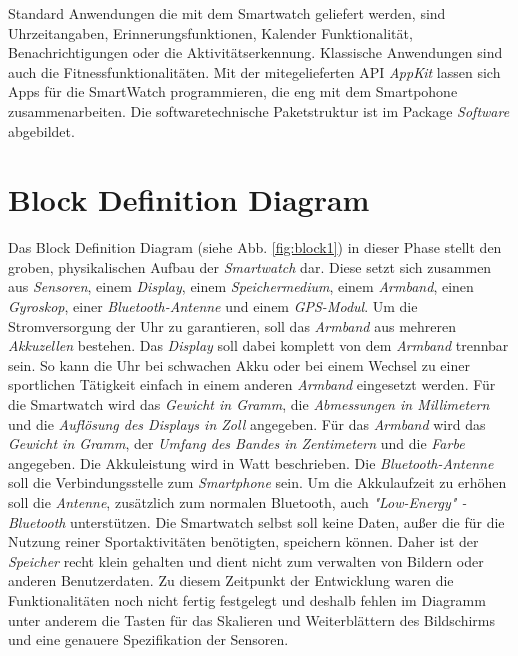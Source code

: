 Standard Anwendungen die mit dem Smartwatch geliefert werden, sind Uhrzeitangaben, Erinnerungsfunktionen, Kalender Funktionalität, Benachrichtigungen oder die Aktivitätserkennung. Klassische Anwendungen sind auch die Fitnessfunktionalitäten.
Mit der mitegelieferten API \textit{AppKit} lassen sich Apps für die SmartWatch programmieren, die eng mit dem Smartpohone zusammenarbeiten.
Die softwaretechnische Paketstruktur ist im Package \textit{Software} abgebildet.

\section{Block Definition Diagram}

Das Block Definition Diagram (siehe Abb. \ref{fig:block1}) in dieser Phase stellt den groben, physikalischen Aufbau der \textit{Smartwatch} dar. Diese setzt sich zusammen aus \textit{Sensoren}, einem \textit{Display}, einem \textit{Speichermedium}, einem \textit{Armband}, einen \textit{Gyroskop}, einer \textit{Bluetooth-Antenne} und einem \textit{GPS-Modul}. Um die Stromversorgung der Uhr zu garantieren, soll das \textit{Armband} aus mehreren \textit{Akkuzellen} bestehen. Das \textit{Display} soll dabei komplett von dem \textit{Armband} trennbar sein. So kann die Uhr bei schwachen Akku oder bei einem Wechsel zu einer sportlichen Tätigkeit einfach in einem anderen \textit{Armband} eingesetzt werden. Für die Smartwatch wird das \textit{Gewicht in Gramm}, die \textit{Abmessungen in Millimetern} und die \textit{Auflösung des Displays in Zoll} angegeben. Für das \textit{Armband} wird das \textit{Gewicht in Gramm}, der \textit{Umfang des Bandes in Zentimetern} und die \textit{Farbe} angegeben. Die Akkuleistung wird in Watt beschrieben. Die \textit{Bluetooth-Antenne} soll die Verbindungsstelle zum \textit{Smartphone} sein. Um die Akkulaufzeit zu erhöhen soll die \textit{Antenne}, zusätzlich zum normalen Bluetooth, auch \textit{"Low-Energy" -Bluetooth} unterstützen. Die Smartwatch selbst soll keine Daten, außer die für die Nutzung reiner Sportaktivitäten benötigten, speichern können. Daher ist der \textit{Speicher} recht klein gehalten und dient nicht zum verwalten von Bildern oder anderen Benutzerdaten.
Zu diesem Zeitpunkt der Entwicklung waren die Funktionalitäten noch nicht fertig festgelegt und deshalb fehlen im Diagramm unter anderem die Tasten für das Skalieren und Weiterblättern des Bildschirms und eine genauere Spezifikation der Sensoren.

